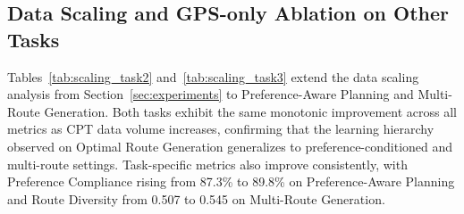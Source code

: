 \documentclass{article}
\begin{document}
\begin{table}[h]
\centering
\caption{Tool-augmented LLM results on \textbf{Optimal Route Generation} over 1{,}000 test samples. Each LLM retrieves candidate routes from the Amap transit routing API and selects the best one. Estimation Accuracy and MAPE are omitted as numeric fields are inherited from the API. Column headers follow Table~\ref{tab:llm_comparison}.}
\label{tab:rag_comparison}
\small
\setlength{\tabcolsep}{3pt}
\renewcommand{\arraystretch}{1.05}
\end{table}

\subsection{Data Scaling and GPS-only Ablation on Other Tasks}
\label{app:scaling_additional}

Tables~\ref{tab:scaling_task2} and~\ref{tab:scaling_task3} extend the data scaling analysis from Section~\ref{sec:experiments} to Preference-Aware Planning and Multi-Route Generation. Both tasks exhibit the same monotonic improvement across all metrics as CPT data volume increases, confirming that the learning hierarchy observed on Optimal Route Generation generalizes to preference-conditioned and multi-route settings. Task-specific metrics also improve consistently, with Preference Compliance rising from 87.3\% to 89.8\% on Preference-Aware Planning and Route Diversity from 0.507 to 0.545 on Multi-Route Generation.
\end{document}
